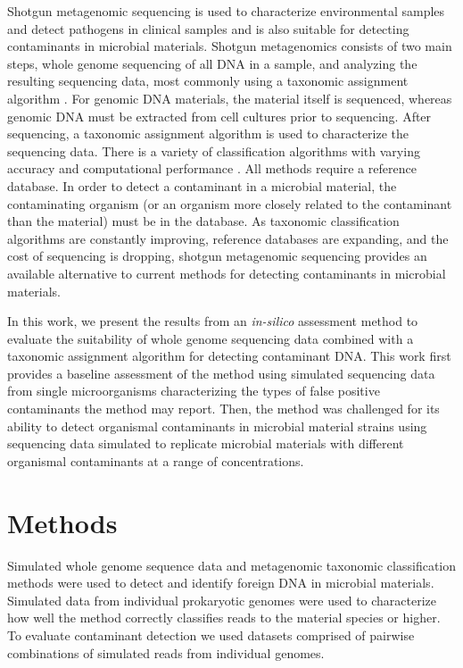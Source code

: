 \documentclass[fleqn,10pt,lineno]{wlpeerj}\usepackage[]{graphicx}\usepackage[]{color}
\begin{document}
Shotgun metagenomic sequencing is used to characterize environmental samples and detect pathogens in clinical samples and is also suitable for detecting contaminants in microbial materials.
Shotgun metagenomics consists of two main steps, whole genome sequencing of all DNA in a sample, and analyzing the resulting sequencing data, most commonly using a taxonomic assignment algorithm \citep{Thomas2012}.
For genomic DNA materials, the material itself is sequenced, whereas genomic DNA must be extracted from cell cultures prior to sequencing.
After sequencing, a taxonomic assignment algorithm is used to characterize the sequencing data.
There is a variety of classification algorithms with varying accuracy and computational performance \citep{Bazinet2012,menzel2016fast}.
All methods require a reference database.
In order to detect a contaminant in a microbial material, the contaminating organism (or an organism more closely related to the contaminant than the material) must be in the database.
As taxonomic classification algorithms are constantly improving, reference databases are expanding, and the cost of sequencing is dropping, shotgun metagenomic sequencing provides an available alternative to current methods for detecting contaminants in microbial materials.

In this work, we present the results from an \textit{in-silico} assessment method to evaluate the suitability of whole genome sequencing data combined with a taxonomic assignment algorithm for detecting contaminant DNA.
This work first provides a baseline assessment of the method using simulated sequencing data from single microorganisms characterizing the types of false positive contaminants the method may report.
Then, the method was challenged for its ability to detect organismal contaminants in microbial material strains using sequencing data simulated to replicate microbial materials with different organismal contaminants at a range of concentrations.

\section*{Methods}
Simulated whole genome sequence data and metagenomic taxonomic classification methods were used to detect and identify foreign DNA in microbial materials.
Simulated data from individual prokaryotic genomes were used to characterize how well the method correctly classifies reads to the material species or higher.
To evaluate contaminant detection we used datasets comprised of pairwise combinations of simulated reads from individual genomes.
\end{document}
